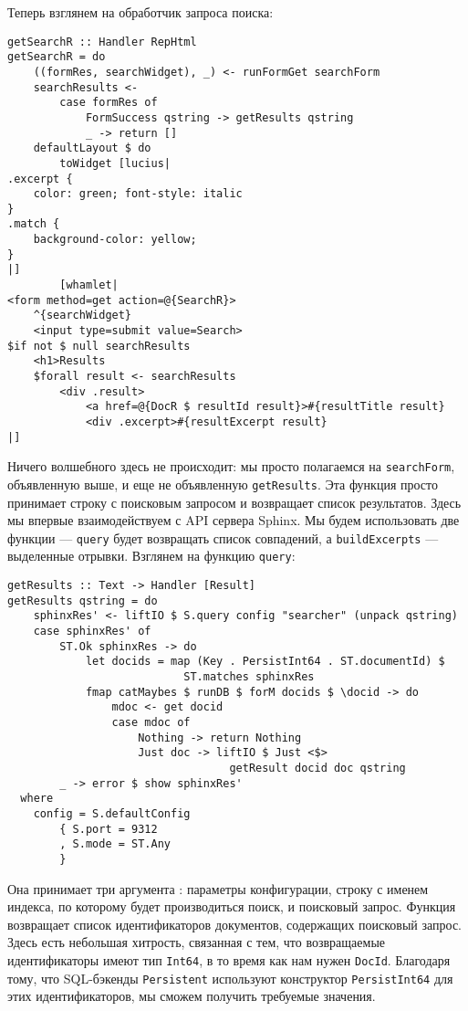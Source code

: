 Теперь взглянем на обработчик запроса поиска: %

\begin{lstlisting}
getSearchR :: Handler RepHtml
getSearchR = do
    ((formRes, searchWidget), _) <- runFormGet searchForm
    searchResults <-
        case formRes of
            FormSuccess qstring -> getResults qstring
            _ -> return []
    defaultLayout $ do
        toWidget [lucius|
.excerpt {
    color: green; font-style: italic
}
.match {
    background-color: yellow;
}
|]
        [whamlet|
<form method=get action=@{SearchR}>
    ^{searchWidget}
    <input type=submit value=Search>
$if not $ null searchResults
    <h1>Results
    $forall result <- searchResults
        <div .result>
            <a href=@{DocR $ resultId result}>#{resultTitle result}
            <div .excerpt>#{resultExcerpt result}
|]
\end{lstlisting}%

Ничего волшебного здесь не происходит: мы просто полагаемся на \lstinline'searchForm', объявленную выше, и еще не объявленную \lstinline'getResults'. Эта функция просто принимает строку с поисковым запросом и возвращает список результатов. Здесь мы впервые взаимодействуем с API сервера Sphinx. Мы будем использовать две функции --- \lstinline'query' будет возвращать список совпадений, а \lstinline'buildExcerpts' --- выделенные отрывки. Взглянем на функцию \lstinline!query!:

\begin{lstlisting}
getResults :: Text -> Handler [Result]
getResults qstring = do
    sphinxRes' <- liftIO $ S.query config "searcher" (unpack qstring)
    case sphinxRes' of
        ST.Ok sphinxRes -> do
            let docids = map (Key . PersistInt64 . ST.documentId) $
                           ST.matches sphinxRes
            fmap catMaybes $ runDB $ forM docids $ \docid -> do
                mdoc <- get docid
                case mdoc of
                    Nothing -> return Nothing
                    Just doc -> liftIO $ Just <$>
                                  getResult docid doc qstring
        _ -> error $ show sphinxRes'
  where
    config = S.defaultConfig
        { S.port = 9312
        , S.mode = ST.Any
        }
\end{lstlisting}%

Она принимает три аргумента : параметры конфигурации, строку с именем индекса, по которому будет производиться поиск, и поисковый запрос. Функция возвращает список идентификаторов документов, содержащих поисковый запрос. Здесь есть небольшая хитрость, связанная с тем, что возвращаемые идентификаторы имеют тип \lstinline'Int64', в то время как нам нужен \lstinline'DocId'. Благодаря тому, что SQL-бэкенды \lstinline'Persistent' используют конструктор \lstinline'PersistInt64' для этих идентификаторов, мы сможем получить требуемые значения.

